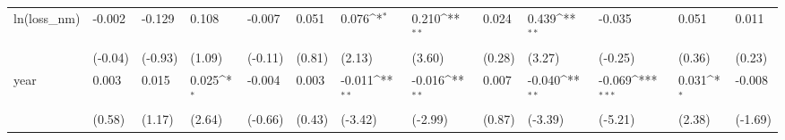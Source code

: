 \def\sym#1{\ifmmode^{#1}\else\(^{#1}\)\fi}
\begin{tabular}{p{1.5cm} p{1.7cm} p{1.7cm} p{1.7cm}  p{1.7cm} p{1.7cm} p{1.7cm} p{1.7cm} p{1.7cm}  p{1.7cm} p{1.7cm} p{1.7cm} p{1.7cm} }
\hline
ln(loss\_nm)     &   -0.002         &   -0.129         &    0.108         &   -0.007         &    0.051         &    0.076\sym{*}  &    0.210\sym{**} &    0.024         &    0.439\sym{**} &   -0.035         &    0.051         &    0.011         \\
                &  (-0.04)         &  (-0.93)         &   (1.09)         &  (-0.11)         &   (0.81)         &   (2.13)         &   (3.60)         &   (0.28)         &   (3.27)         &  (-0.25)         &   (0.36)         &   (0.23)         \\
year            &    0.003         &    0.015         &    0.025\sym{*}  &   -0.004         &    0.003         &   -0.011\sym{**} &   -0.016\sym{**} &    0.007         &   -0.040\sym{**} &   -0.069\sym{***}&    0.031\sym{*}  &   -0.008         \\
                &   (0.58)         &   (1.17)         &   (2.64)         &  (-0.66)         &   (0.43)         &  (-3.42)         &  (-2.99)         &   (0.87)         &  (-3.39)         &  (-5.21)         &   (2.38)         &  (-1.69)         \\
\end{tabular}
